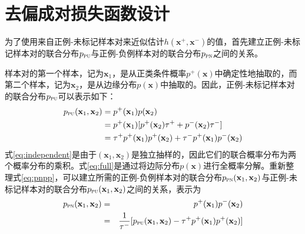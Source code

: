 \section{去偏成对损失函数设计}
为了使用来自正例-未标记样本对来近似估计$h(\mathbf{x}^+,\mathbf{x}^-)$的值，首先建立正例-未标记样本对的联合分布$p_\textsc{pu}$与正例-负例样本对的联合分布$p_\textsc{pn}$之间的关系。

样本对的第一个样本，记为$\mathbf x_1$，是从正类条件概率$p^+(\mathbf x)$中确定性地抽取的，而第二个样本，记为$\mathbf{x}_2$，是从边缘分布$p(\mathbf{x})$中抽取的。因此，正例-未标记样本对的联合分布$p_\textsc{pu}$可以表示如下：
\begin{align}
	p_\textsc{pu}(\mathbf{x}_1, \mathbf{x}_2) &= p^+( \mathbf{x}_1) p( \mathbf{x}_2)  \label{eq:independent} \\
	&= p^+( \mathbf{x}_1) [p^+(\mathbf x_2) \tau^+ +p^-(\mathbf x_2)\tau^- ] \label{eq:full}\\
	&= \tau^+p^+( \mathbf{x}_1) p^+(\mathbf x_2) + \tau^-p^+( \mathbf{x}_1)p^-(\mathbf x_2) \label{eq:pnpp}
\end{align}
式\eqref{eq:independent}是由于$(\mathbf{x}_1, \mathbf{x}_2)$是独立抽样的，因此它们的联合概率分布为两个概率分布的乘积。式\eqref{eq:full}是通过将边际分布$p(\mathbf{x})$进行全概率分解。重新整理式\eqref{eq:pnpp}，可以建立所需的正例-负例样本对的联合分布$p_\textsc{pn}(\mathbf{x}_1, \mathbf{x}_2)$与正例-未标记样本对的联合分布$p_\textsc{pu}(\mathbf{x}_1, \mathbf{x}_2)$之间的关系，表示为
\begin{eqnarray}\label{eq:jointpn}
	p_\textsc{pn}(\mathbf{x}_1, \mathbf{x}_2)  &=& p^+( \mathbf{x}_1)p^-(\mathbf x_2) \nonumber \\
	&=& \frac{1}{\tau^-}[p_{\textsc{pu}}(\mathbf{x}_1, \mathbf{x}_2)- \tau^+p^+( \mathbf{x}_1) p^+(\mathbf x_2)] \label{eq:pndist}
\end{eqnarray}

